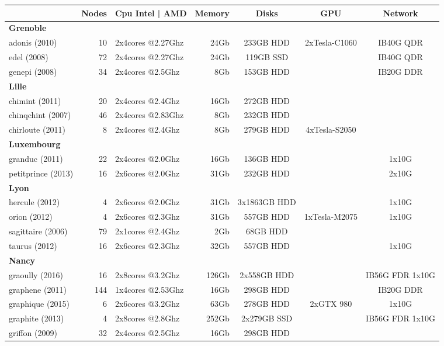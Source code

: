 \begin{center}
\begin{tabular}{|l|r|l|r|c|c|c|}
\hline
  & \textbf{Nodes} & \textbf{Cpu Intel | AMD} & \textbf{Memory} & \textbf{Disks} & \textbf{GPU} & \textbf{Network} \\ 
\hline
\textbf{Grenoble} &  &  &  &  &  &  \\
adonis (2010) & 10 & 2x4cores @2.27Ghz & 24Gb &  233GB HDD & 2xTesla-C1060 & IB40G QDR \\
edel (2008) & 72 & 2x4cores @2.27Ghz & 24Gb &  119GB SSD &  & IB40G QDR \\
genepi (2008) & 34 & 2x4cores @2.5Ghz & 8Gb &  153GB HDD &  & IB20G DDR \\
\textbf{Lille} &  &  &  &  &  &  \\
chimint (2011) & 20 & 2x4cores @2.4Ghz & 16Gb &  272GB HDD &  &  \\
chinqchint (2007) & 46 & 2x4cores @2.83Ghz & 8Gb &  232GB HDD &  &  \\
chirloute (2011) & 8 & 2x4cores @2.4Ghz & 8Gb &  279GB HDD & 4xTesla-S2050 &  \\
\textbf{Luxembourg} &  &  &  &  &  &  \\
granduc (2011) & 22 & 2x4cores @2.0Ghz & 16Gb &  136GB HDD &  &  1x10G \\
petitprince (2013) & 16 & 2x6cores @2.0Ghz & 31Gb &  232GB HDD &  &  2x10G \\
\textbf{Lyon} &  &  &  &  &  &  \\
hercule (2012) & 4 & 2x6cores @2.0Ghz & 31Gb &  3x1863GB HDD &  &  1x10G \\
orion (2012) & 4 & 2x6cores @2.3Ghz & 31Gb &  557GB HDD & 1xTesla-M2075 &  1x10G \\
sagittaire (2006) & 79 & 2x1cores @2.4Ghz & 2Gb &  68GB HDD &  &  \\
taurus (2012) & 16 & 2x6cores @2.3Ghz & 32Gb &  557GB HDD &  &  1x10G \\
\textbf{Nancy} &  &  &  &  &  &  \\
graoully (2016) & 16 & 2x8cores @3.2Ghz & 126Gb &  2x558GB HDD &  & IB56G FDR 1x10G \\
graphene (2011) & 144 & 1x4cores @2.53Ghz & 16Gb &  298GB HDD &  & IB20G DDR \\
graphique (2015) & 6 & 2x6cores @3.2Ghz & 63Gb &  278GB HDD & 2xGTX 980 &  1x10G \\
graphite (2013) & 4 & 2x8cores @2.8Ghz & 252Gb &  2x279GB SSD &  & IB56G FDR 1x10G \\
griffon (2009) & 32 & 2x4cores @2.5Ghz & 16Gb &  298GB HDD &  &  \\

\end{tabular}
\end{center}
